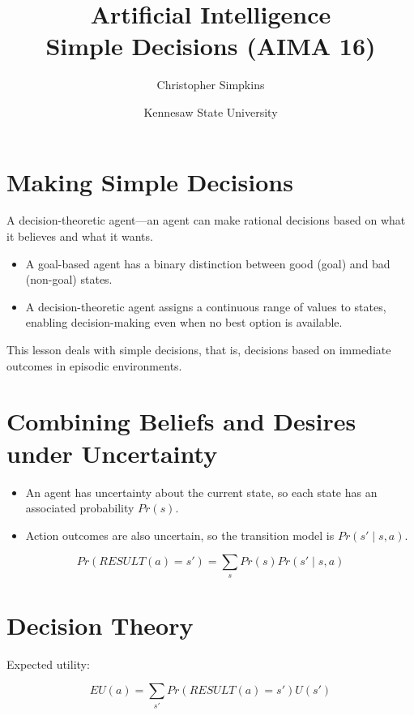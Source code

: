 \documentclass[11pt]{article}
\author{Christopher Simpkins}
\date{Kennesaw State University}
\title{Artificial Intelligence\\\medskip
\large Simple Decisions (AIMA 16)}
\begin{document}
\maketitle
\section{Making Simple Decisions}
\label{sec:org20e69c0}

A decision-theoretic agent—an agent can make rational decisions based on what it believes and what it wants.

\begin{itemize}
\item A goal-based agent has a binary distinction between good (goal) and bad (non-goal) states.

\item A decision-theoretic agent assigns a continuous range of values to states, enabling decision-making even when no best option is available.
\end{itemize}

This lesson deals with simple decisions, that is, decisions based on immediate outcomes in episodic environments.
\section{Combining Beliefs and Desires under Uncertainty}
\label{sec:org8f5e2f5}

\begin{itemize}
\item An agent has uncertainty about the current state, so each state has an associated probability \(Pr(s)\).

\item Action outcomes are also uncertain, so the transition model is \(Pr(s' \mid s, a)\).
\end{itemize}

\begin{equation*}
Pr(RESULT(a) = s') = \sum_s Pr(s) Pr(s' \mid s, a)
\end{equation*}
\section{Decision Theory}
\label{sec:org669e07a}

Expected utility:

\begin{equation*}
EU(a) = \sum_{s'} Pr(RESULT(a) = s') U(s') \tag{16.1}
\end{equation*}
\end{document}
